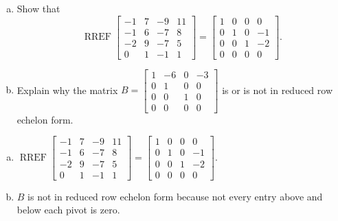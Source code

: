 
\begin{exerciseStatement}

\begin{enumerate}[(a)]
\item Show that \[\operatorname{RREF} \left[\begin{array}{cccc}
-1 & 7 & -9 & 11 \\
-1 & 6 & -7 & 8 \\
-2 & 9 & -7 & 5 \\
0 & 1 & -1 & 1
\end{array}\right] = \left[\begin{array}{cccc}
1 & 0 & 0 & 0 \\
0 & 1 & 0 & -1 \\
0 & 0 & 1 & -2 \\
0 & 0 & 0 & 0
\end{array}\right] .\]
\item Explain why the matrix \(B= \left[\begin{array}{cccc}
1 & -6 & 0 & -3 \\
0 & 1 & 0 & 0 \\
0 & 0 & 1 & 0 \\
0 & 0 & 0 & 0
\end{array}\right] \) is or is not in reduced row echelon form.
\end{enumerate}
    
\end{exerciseStatement}
    
\begin{exerciseAnswer} 

\begin{enumerate}[(a)]
\item \(\operatorname{RREF} \left[\begin{array}{cccc}
-1 & 7 & -9 & 11 \\
-1 & 6 & -7 & 8 \\
-2 & 9 & -7 & 5 \\
0 & 1 & -1 & 1
\end{array}\right] = \left[\begin{array}{cccc}
1 & 0 & 0 & 0 \\
0 & 1 & 0 & -1 \\
0 & 0 & 1 & -2 \\
0 & 0 & 0 & 0
\end{array}\right] .\)
\item \(B\) is not in reduced row echelon form because not every entry above and below each pivot is zero. 
\end{enumerate}
    
\end{exerciseAnswer}
    
